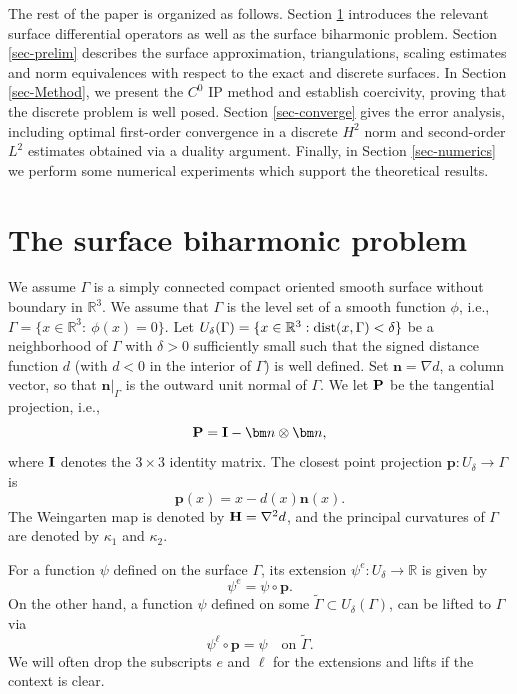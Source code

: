 \documentclass[10pt, a4paper]{amsart}
\newcommand{\bn}{{\bm n}}
\newcommand{\bp}{{\bm p}}
\newcommand{\bbR}{\mathbb{R}}
\newcommand{\nab}{\nabla}
\theoremstyle{definition}
\theoremstyle{remark}
\theoremstyle{example}
\numberwithin{equation}{section}
\begin{document}
The rest of the paper is organized as follows.
Section \ref{sec-biharmonic} introduces 
the relevant surface differential operators as well as
the surface biharmonic problem. Section 
\ref{sec-prelim} describes the surface approximation, triangulations, scaling estimates
and norm equivalences with respect to  the exact and discrete surfaces. 
In Section \ref{sec-Method}, we present the $C^0$ IP method and establish
coercivity, proving that the discrete problem is well posed.
Section \ref{sec-converge} gives the error analysis,
including optimal first-order convergence 
in a discrete $H^2$ norm and second-order $L^2$ estimates
obtained via a duality argument.
Finally, in Section \ref{sec-numerics} we perform
some numerical experiments which support
the theoretical results.




\section{The surface biharmonic problem}\label{sec-biharmonic}

We assume $\Gamma$ is a simply connected compact oriented smooth surface without boundary in $\bbR^3$. We assume that $\Gamma$ is the level set of a smooth function 
$\phi$, i.e., $\Gamma = \{x\in \bbR^3:\ \phi(x) = 0\}$.
Let $U_{\delta}(\Gamma) = \{x \in \bbR^3: {\rm dist}(x, \Gamma) < \delta\}$ be a neighborhood
of $\Gamma$ with $\delta > 0$ sufficiently small such that the signed distance function $d$ (with $d < 0$ in the interior of $\Gamma$) is well defined. Set $\bn = \nab d$, a column vector,
so that $\bn|_{\Gamma}$ is the outward unit normal of $\Gamma$. We let ${\bf P}$ be the tangential projection, i.e.,
\[
{\bf P} = {\bf I} - \bn \otimes \bn,
\]
where ${\bf I}$ denotes the $3\times 3$ identity matrix.
The closest point projection $\bp:U_\delta\to \Gamma$ is
\[
\bp(x) = x - d(x)\bn(x).
\]
The Weingarten map is denoted by ${\bf H} = \nab^2 d$,
and the principal curvatures of $\Gamma$ are denoted by $\kappa_1$ and $\kappa_2$.

For a function $\psi$ defined on the surface $\Gamma$, its extension
$\psi^e: U_\delta \rightarrow \bbR$ is given by
\[
\psi^e = \psi \circ \bp.
\]
On the other hand, a function $\psi$ defined
on some $\tilde \Gamma \subset U_{\delta}(\Gamma)$,
can be lifted to $\Gamma$ via
\[
\psi^\ell \circ \bp = \psi\quad\text{on }\tilde \Gamma.
\]
We will often drop the subscripts $e$ and $\ell$ for the extensions and lifts
if the context is clear.
\end{document}

